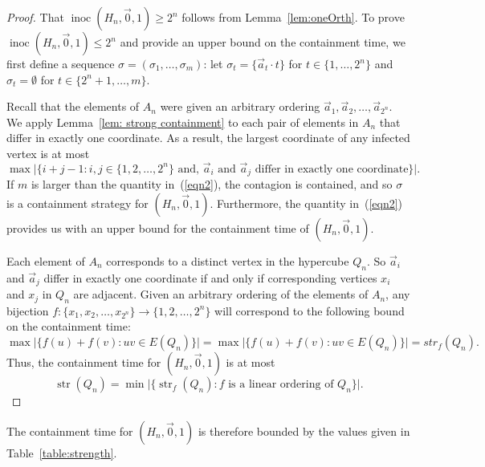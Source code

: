 \documentclass[unknownkeysallowed]{article}
\theoremstyle{definition}\newtheorem{strategy}{Strategy}
\theoremstyle{definition}\newtheorem{notation}{Notation}[theorem]
\DeclareMathOperator{\strength}{str}
\DeclareMathOperator{\inoc}{inoc}
\begin{document}
\begin{proof} 
That $\inoc(H_n,\vec{0},1) \geq 2^n$ follows from Lemma~\ref{lem:oneOrth}.  To prove $\inoc(H_n,\vec{0},1) \leq 2^n$ and provide an upper bound on the containment time, we first define a sequence $\sigma = (\sigma_1,\dots,\sigma_m)$:  let $\sigma_t = \{\vec{a}_t \cdot t\}$ for $t \in \{1,\dots,2^n\}$ and $\sigma_t = \emptyset$ for $t \in \{2^n+1,\dots,m\}$.

Recall that the elements of $A_n$ were given an arbitrary ordering $\vec{a}_1,\vec{a}_2,\dots,\vec{a}_{2^n}$.  We apply Lemma~\ref{lem: strong containment} to each pair of elements in $A_n$ that differ in exactly one coordinate.  As a result,  the largest coordinate of any infected vertex is at most \begin{equation}\label{eqn2}\max \big|\{i+j-1 : i,j \in \{1,2,\dots,2^n\} \text{~and, $\vec{a}_i$ and $\vec{a}_j$ differ in exactly one coordinate}\}\big|.\end{equation}  If $m$ is larger than the quantity in~(\ref{eqn2}), the contagion is contained, and so  $\sigma$ is a containment strategy for $(H_n,\vec{0},1)$. Furthermore, the quantity in~(\ref{eqn2}) provides us with an upper bound for the containment time of $(H_n,\vec{0},1)$. 

Each element of $A_n$ corresponds to a distinct vertex in the hypercube $Q_n$.  So $\vec{a}_i$ and $\vec{a}_j$ differ in exactly one coordinate if and only if corresponding vertices $x_i$ and $x_j$ in $Q_n$ are adjacent.  Given an arbitrary ordering of the elements of $A_n$, any bijection $f : \{x_1,x_2,\dots,x_{2^n}\} \rightarrow \{1,2,\dots,2^n\}$ will correspond to the following bound on the containment time: $$\max \big| \{f(u)+f(v): uv \in E(Q_n)\}\big| = \max \big| \{f(u)+f(v) : uv \in E(Q_n)\}\big| = str_f(Q_n).$$  Thus, the containment time for $(H_n,\vec{0},1)$ is at most $$\strength(Q_n) = \min \big| \{\strength_f(Q_n) : f \text{~is a linear ordering of~} Q_n\}\big|.$$

\end{proof}

The containment time for $(H_n,\vec{0},1)$ is therefore bounded by the values given in Table~\ref{table:strength}.
\end{document}
